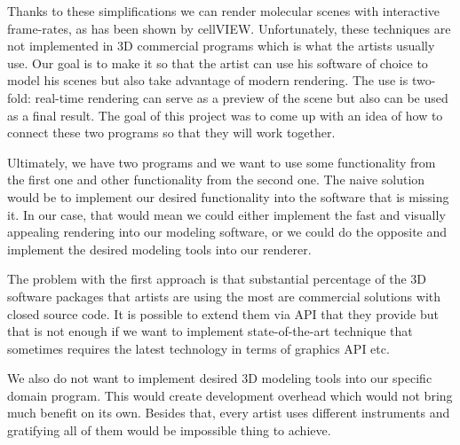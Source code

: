 \documentclass[
  digital, %
  table,   %
  nolof,     %
  nolot,     %
]{fithesis3}
\begin{document}
Thanks to these simplifications we can render molecular scenes with interactive frame-rates, as has been shown by cellVIEW\cite{cellVIEW_2015}. Unfortunately, these techniques are not implemented in 3D commercial programs which is what the artists usually use. Our goal is to make it so that the artist can use his software of choice to model his scenes but also take advantage of modern rendering. The use is two-fold: real-time rendering can serve as a preview of the scene but also can be used as a final result. The goal of this project was to come up with an idea of how to connect these two programs so that they will work together.

Ultimately, we have two programs and we want to use some functionality from the first one and other functionality from the second one. The naive solution would be to implement our desired functionality into the software that is missing it. In our case, that would mean we could either implement the fast and visually appealing rendering into our modeling software, or we could do the opposite and implement the desired modeling tools into our renderer.

The problem with the first approach is that substantial percentage of the 3D software packages that artists are using the most are commercial solutions with closed source code. It is possible to extend them via API that they provide but that is not enough if we want to implement state-of-the-art technique that sometimes requires the latest technology in terms of graphics API etc.

We also do not want to implement desired 3D modeling tools into our specific domain program. This would create development overhead which would not bring much benefit on its own. Besides that, every artist uses different instruments and gratifying all of them would be impossible thing to achieve.
\end{document}
